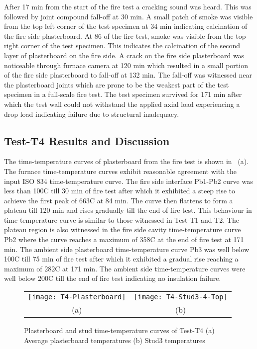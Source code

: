 After 17 min from the start of the fire test a cracking sound was heard. This was followed by joint compound fall-off at 30 min. A small patch of smoke was visible from the top left corner of the test specimen at 34 min indicating calcination of the fire side plasterboard. At 86 of the fire test, smoke was visible from the top right corner of the test specimen. This indicates the calcination of the second layer of plasterboard on the fire side. A crack on the fire side plasterboard was noticeable through furnace camera at 120 min which resulted in a small portion of the fire side plasterboard to fall-off at 132 min. The fall-off was witnessed near the plasterboard joints which are prone to be the weakest part of the test specimen in a full-scale fire test. The test specimen survived for 171 min after which the test wall could not withstand the applied axial load experiencing a drop load indicating failure due to structural inadequacy.

\subsection{Test-T4 Results and Discussion}

The time-temperature curves of plasterboard from the fire test is shown in ~(a). The furnace time-temperature curves exhibit reasonable agreement with the input ISO 834 time-temperature curve. The fire side interface Pb1-Pb2 curve was less than 100\degree C till 30 min of fire test after which it exhibited a steep rise to achieve the first peak of 663\degree C at 84 min. The curve then flattens to form a plateau till 120 min and rises gradually till the end of fire test. This behaviour in time-temperature curve is similar to those witnessed in Test-T1 and T2. The plateau region is also witnessed in the fire side cavity time-temperature curve Pb2 where the curve reaches a maximum of 358\degree C at the end of fire test at 171 min. The ambient side plasterboard time-temperature curve Pb3 was well below 100\degree C till 75 min of fire test after which it exhibited a gradual rise reaching a maximum of  282\degree C at 171 min. The ambient side time-temperature curves were well below 200\degree C till the end of fire test indicating no insulation failure.
\begin{figure}[!htbp]
	\centering
		\begin{tabular}{cc}
			\texttt{[image: T4-Plasterboard]} & \texttt{[image: T4-Stud3-4-Top]} \\
			(a) & (b) \\
		\end{tabular} 
		\caption{Plasterboard and stud time-temperature curves of Test-T4 (a) Average plasterboard temperatures (b) Stud3 temperatures}
		\label{fig:T4-PB-Stud}
\end{figure}

